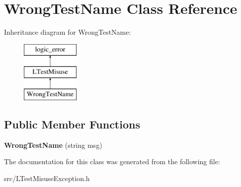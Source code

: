 \hypertarget{class_wrong_test_name}{\section{Wrong\-Test\-Name Class Reference}
\label{class_wrong_test_name}
}
Inheritance diagram for Wrong\-Test\-Name\-:\begin{figure}[H]
\begin{center}
\leavevmode
\includegraphics[height=3.000000cm]{class_wrong_test_name}
\end{center}
\end{figure}
\subsection*{Public Member Functions}
\begin{DoxyCompactItemize}
\item 
\hypertarget{class_wrong_test_name_a67d43463f9e3648fe7b5dc9c7dff5956}{{\bfseries Wrong\-Test\-Name} (string msg)}\label{class_wrong_test_name_a67d43463f9e3648fe7b5dc9c7dff5956}

\end{DoxyCompactItemize}


The documentation for this class was generated from the following file\-:\begin{DoxyCompactItemize}
\item 
src/L\-Test\-Misuse\-Exception.\-h\end{DoxyCompactItemize}
